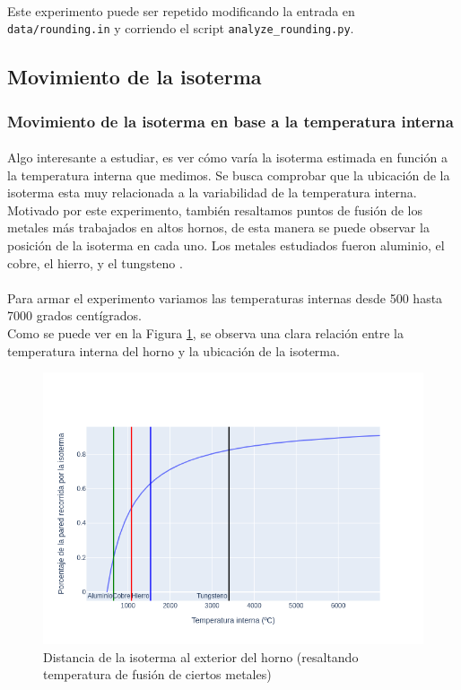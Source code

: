 \documentclass[12pt]{article}
\begin{document}
\paragraph{} Este experimento puede ser repetido modificando la entrada en \texttt{data/rounding.in} y corriendo el script \texttt{analyze\_rounding.py}.

\subsection{Movimiento de la isoterma}

\subsubsection{Movimiento de la isoterma en base a la temperatura interna}

\paragraph{} Algo interesante a estudiar, es ver cómo varía la isoterma estimada en función a la temperatura interna que medimos. Se busca comprobar que la ubicación de la isoterma esta muy relacionada a la variabilidad de la temperatura interna. Motivado por este experimento, también resaltamos puntos de fusión de los metales más trabajados en altos hornos, de esta manera se puede observar la posición de la isoterma en cada uno. Los metales estudiados fueron aluminio, el cobre, el hierro, y el tungsteno \cite{big:metales}. 
\paragraph{} Para armar el experimento variamos las temperaturas internas desde 500 hasta 7000 grados centígrados. \\
Como se puede ver en la Figura \ref{fig:isotherm_by_inner_metals}, se observa una clara relación entre la temperatura interna del horno y la ubicación de la isoterma. 

\begin{figure}[H]
  \centering
  \includegraphics[scale=0.5]{isotherm_by_inner_metals}
  \caption{Distancia de la isoterma al exterior del horno (resaltando temperatura de fusión de ciertos metales)}
  \label{fig:isotherm_by_inner_metals}
\end{figure}
\end{document}
